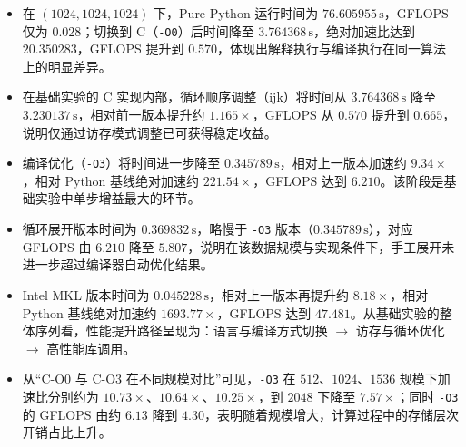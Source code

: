 \documentclass{SYSUReport}
\begin{document}
\begin{itemize}
    \item 在 $(1024,1024,1024)$ 下，Pure Python 运行时间为 $76.605955\,\mathrm{s}$，GFLOPS 仅为 $0.028$；切换到 C（\texttt{-O0}）后时间降至 $3.764368\,\mathrm{s}$，绝对加速比达到 $20.350283$，GFLOPS 提升到 $0.570$，体现出解释执行与编译执行在同一算法上的明显差异。
    \item 在基础实验的 C 实现内部，循环顺序调整（ijk）将时间从 $3.764368\,\mathrm{s}$ 降至 $3.230137\,\mathrm{s}$，相对前一版本提升约 $1.165\times$，GFLOPS 从 $0.570$ 提升到 $0.665$，说明仅通过访存模式调整已可获得稳定收益。
    \item 编译优化（\texttt{-O3}）将时间进一步降至 $0.345789\,\mathrm{s}$，相对上一版本加速约 $9.34\times$，相对 Python 基线绝对加速约 $221.54\times$，GFLOPS 达到 $6.210$。该阶段是基础实验中单步增益最大的环节。
    \item 循环展开版本时间为 $0.369832\,\mathrm{s}$，略慢于 \texttt{-O3} 版本（$0.345789\,\mathrm{s}$），对应 GFLOPS 由 $6.210$ 降至 $5.807$，说明在该数据规模与实现条件下，手工展开未进一步超过编译器自动优化结果。
    \item Intel MKL 版本时间为 $0.045228\,\mathrm{s}$，相对上一版本再提升约 $8.18\times$，相对 Python 基线绝对加速约 $1693.77\times$，GFLOPS 达到 $47.481$。从基础实验的整体序列看，性能提升路径呈现为：语言与编译方式切换 $\rightarrow$ 访存与循环优化 $\rightarrow$ 高性能库调用。
    \item 从“C-O0 与 C-O3 在不同规模对比”可见，\texttt{-O3} 在 $512$、$1024$、$1536$ 规模下加速比分别约为 $10.73\times$、$10.64\times$、$10.25\times$，到 $2048$ 下降至 $7.57\times$；同时 \texttt{-O3} 的 GFLOPS 由约 $6.13$ 降到 $4.30$，表明随着规模增大，计算过程中的存储层次开销占比上升。
\end{itemize}
\end{document}
